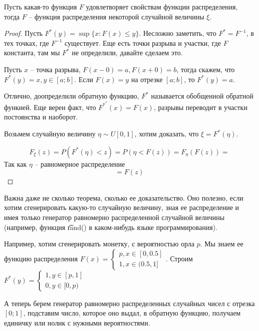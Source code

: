 \begin{theorem}

    Пусть какая-то функция $F$ удовлетворяет свойствам функции распределения, тогда $F$ -- функция распределения некоторой случайной величины $\xi$.
\end{theorem}
\begin{proof}
    Пусть $F^*(y) = \sup \{x\colon F(x) \leq y\}$.
    Несложно заметить, что $F^* = F^{-1}$, в тех точках, где $F^{-1}$ существует. 
    Еще есть точки разрыва и участки, где $F$ константа, там мы $F^*$ не определили, давайте сделаем это.

    Пусть $x$ -- точка разрыва, $F(x-0) = a, F(x+0) = b$, тогда скажем, что $F^*(y) = x, y \in [a; b]$.
    Если $F(x) = y$ на отрезке $[a; b]$, то $F^*(y) = a$.

    Отлично, доопределили обратную функцию, $F^*$ называется обобщенной обратной функией.
    Еще верен факт, что $F^{*^*}(x) = F(x)$, разрывы переводит в участки постоянства и наоборот.

    Возьмем  случайную величину $\eta \sim U[0, 1]$, хотим доказать, что $\xi = F^*(\eta)$.

    $$F_{\xi}(z) = P(F^*(\eta) < z) = P(\eta < F(z)) = F_{\eta}(F(z)) = $$ 
    Так как $\eta$ -- равномерное распределение 
    $$ = F(z)$$ 
\end{proof}
\begin{Rem}
Важна даже не сколько теорема, сколько ее доказательство. Оно полезно, если хотим сгенерировать какую-то случайную величину, зная ее распределение и имея только
генератор равномерно распределенной случайной величины (например, функция \t{rand()} в каком-нибудь языке программирования).

Например, хотим сгенерировать монетку, с вероятностью орла $p$. Мы знаем ее функцию распределения $F(x) = \begin{cases}p, x \in [0, 0.5] \\ 1, x \in (0.5, 1]\end{cases}$.
Строим $F^*(y) = \begin{cases} 1, y \in [p, 1] \\ 0, y \in [0, p) \end{cases}$

А теперь берем генератор равномерно распределенных случайных чисел с отрезка $[0; 1]$, подставим число, которое оно выдал, в обратную функцию, получаем единичку или нолик с нужными вероятностями.
\end{Rem}


